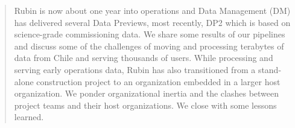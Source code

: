 
\begin{abstract}
Rubin is now about one year into operations and Data Management (DM) has delivered several Data Previews, most recently,  DP2 which is based on science-grade commissioning data.
We share some results of our pipelines and discuss some of the challenges of moving and processing terabytes of data from Chile and serving thousands of users.
While processing and serving early operations data, Rubin  has also transitioned from a stand-alone construction project to an organization embedded in a larger host organization. We ponder organizational inertia and the clashes between project teams and their host organizations.
We close with  some lessons learned.
\end{abstract}

